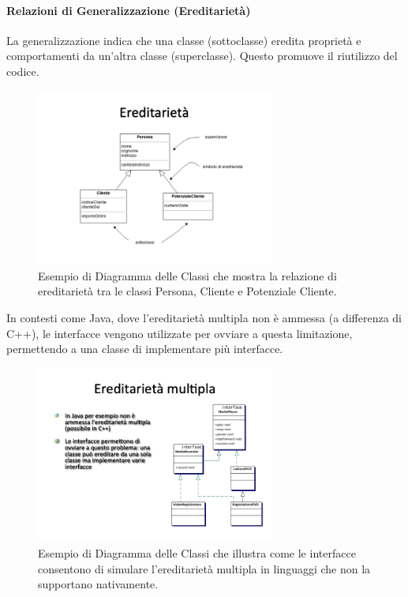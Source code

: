 \paragraph{Relazioni di Generalizzazione (Ereditarietà)}
La generalizzazione indica che una classe (sottoclasse) eredita proprietà e comportamenti da un'altra classe (superclasse). Questo promuove il riutilizzo del codice.
\begin{figure}[h!]
    \centering
    \includegraphics[width=0.7\textwidth]{immagini/uml_class_ereditarieta_generica.png}
    \caption{Esempio di Diagramma delle Classi che mostra la relazione di ereditarietà tra le classi Persona, Cliente e Potenziale Cliente.}
    \label{fig:class_ereditarieta}
\end{figure}
In contesti come Java, dove l'ereditarietà multipla non è ammessa (a differenza di C++), le interfacce vengono utilizzate per ovviare a questa limitazione, permettendo a una classe di implementare più interfacce.
\begin{figure}[h!]
    \centering
    \includegraphics[width=0.7\textwidth]{immagini/uml_class_ereditarieta_multipla_interfacce.png}
    \caption{Esempio di Diagramma delle Classi che illustra come le interfacce consentono di simulare l'ereditarietà multipla in linguaggi che non la supportano nativamente.}
    \label{fig:class_ereditarieta_multipla}
\end{figure}


